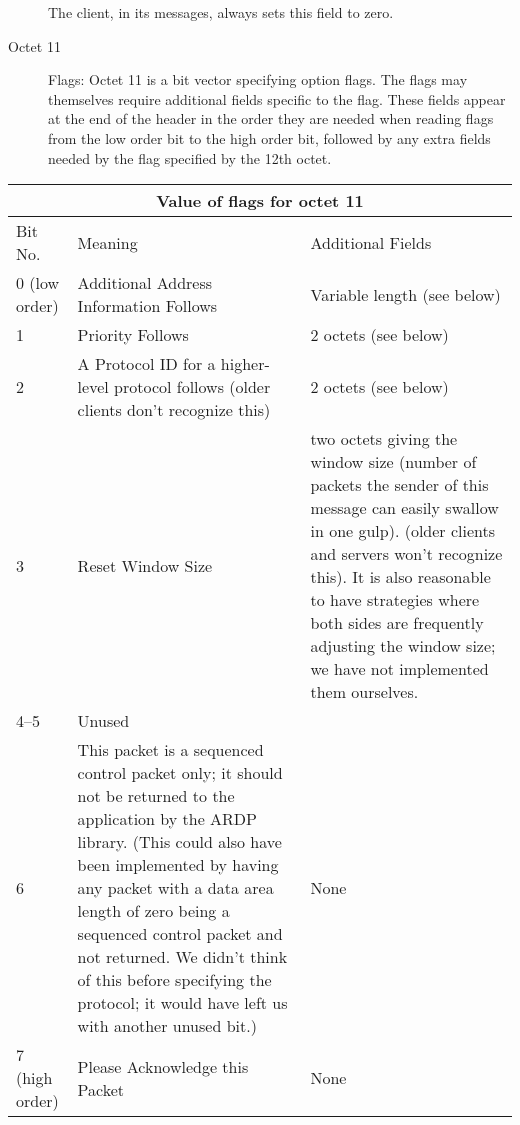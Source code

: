 \begin{description}
The client, in its messages, always sets this field to zero.

\item[Octet 11] Flags: Octet 11 is a bit vector specifying option flags.
The flags may themselves require additional
fields specific to the flag.  These fields appear at the end of the
header in the order they are needed when reading flags from the low
order bit to the high order bit, followed by any extra fields needed
by the flag specified by the 12th octet.  

\end{description}

\begin{center}
\begin{tabular}{|l|p{3.5in}|p{2.0in}|}
\multicolumn{3}{c}{Value of flags for octet 11} \\ \hline
Bit No. & Meaning & Additional Fields \\ \hline
0 (low order) & Additional Address Information Follows & 
	Variable length (see below)\\ \hline 
1       & Priority Follows & 2 octets (see below)\\ \hline
2 & A Protocol ID for a higher-level protocol follows (older clients
don't recognize this) & 
	2 octets (see below) \\ \hline
3 &     Reset Window Size       & two octets giving the window size (number
of packets the sender of this message can easily swallow in one gulp).
(older clients and servers won't recognize this).  It is also
reasonable to have strategies where both sides are frequently
adjusting the window size; we have not implemented them ourselves. \\ \hline
4--5    & Unused & \\ \hline
6       & This packet is a sequenced control packet only; it should
not be returned to the application by the ARDP library.  (This could
also have been implemented by having any packet with a data area
length of zero being a sequenced control packet and not returned.  We
didn't think of this before specifying the protocol; it would have
left us with another unused bit.)  & None \\ \hline
7 (high order) & Please Acknowledge this Packet & None \\ \hline
\end{tabular}
\end{center}


